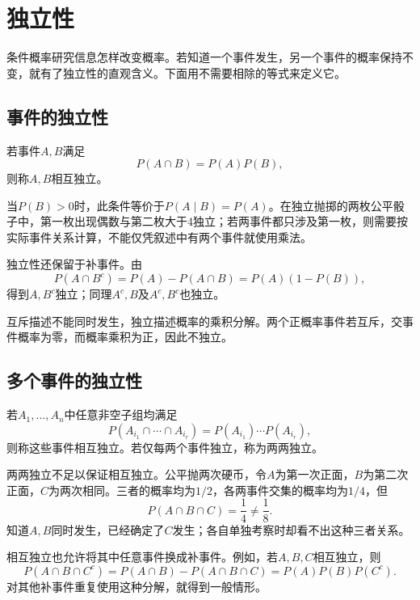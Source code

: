\FloatBarrier
\newpage
\section{独立性}
\label{sec:prob-independence}

条件概率研究信息怎样改变概率。若知道一个事件发生，另一个事件的概率保持不变，就有了独立性的直观含义。下面用不需要相除的等式来定义它。

\subsection{事件的独立性}

\begin{definition}
若事件\(A,B\)满足
\begin{equation}\label{eq:prob-event-independence}
 P(A\cap B)=P(A)P(B),
\end{equation}
则称\(A,B\){\heiti 相互独立}。
\end{definition}

当\(P(B)>0\)时，此条件等价于\(P(A\mid B)=P(A)\)。在独立抛掷的两枚公平骰子中，第一枚出现偶数与第二枚大于4独立；若两事件都只涉及第一枚，则需要按实际事件关系计算，不能仅凭叙述中有两个事件就使用乘法。

独立性还保留于补事件。由
\[
 P(A\cap B^c)=P(A)-P(A\cap B)=P(A)(1-P(B)),
\]
得到\(A,B^c\)独立；同理\(A^c,B\)及\(A^c,B^c\)也独立。

互斥描述不能同时发生，独立描述概率的乘积分解。两个正概率事件若互斥，交事件概率为零，而概率乘积为正，因此不独立。

\subsection{多个事件的独立性}

\begin{definition}
若\(A_1,\ldots,A_n\)中任意非空子组均满足
\[
 P(A_{i_1}\cap\cdots\cap A_{i_r})=
 P(A_{i_1})\cdots P(A_{i_r}),
\]
则称这些事件{\heiti 相互独立}。若仅每两个事件独立，称为两两独立。
\end{definition}

两两独立不足以保证相互独立。公平抛两次硬币，令\(A\)为第一次正面，\(B\)为第二次正面，\(C\)为两次相同。三者的概率均为\(1/2\)，各两事件交集的概率均为\(1/4\)，但
\[
 P(A\cap B\cap C)=\frac14\ne\frac18.
\]
知道\(A,B\)同时发生，已经确定了\(C\)发生；各自单独考察时却看不出这种三者关系。

相互独立也允许将其中任意事件换成补事件。例如，若\(A,B,C\)相互独立，则
\[
 P(A\cap B\cap C^c)=P(A\cap B)-P(A\cap B\cap C)
 =P(A)P(B)P(C^c).
\]
对其他补事件重复使用这种分解，就得到一般情形。

